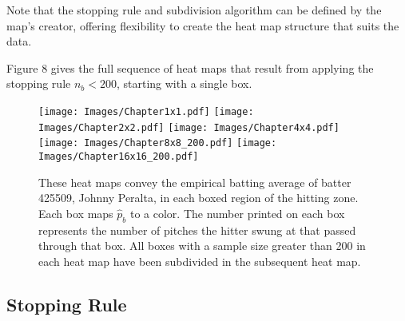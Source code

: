 
Note that the stopping rule and subdivision algorithm can be defined by the map's creator, offering flexibility to create the heat map structure that suits the data. 

Figure 8 gives the full sequence of heat maps that result from applying the stopping rule $n_{b} < 200$, starting with a single box.
        \begin{figure}[H]
      	\centering
      	\texttt{[image: Images/Chapter1x1.pdf]}
      	\texttt{[image: Images/Chapter2x2.pdf]}
      	\texttt{[image: Images/Chapter4x4.pdf]}
      	\texttt{[image: Images/Chapter8x8\_200.pdf]} 
      	\texttt{[image: Images/Chapter16x16\_200.pdf]} 
      	\caption{These heat maps convey the empirical batting average of batter 425509, Johnny Peralta, in each boxed region of the hitting zone. Each box maps $\hat{p}_{b}$ to a color. The number printed on each box represents the number of pitches the hitter swung at that passed through that box. All boxes with a sample size greater than 200 in each heat map have been subdivided in the subsequent heat map.}
      	\end{figure}
      	
\subsection{Stopping Rule}

